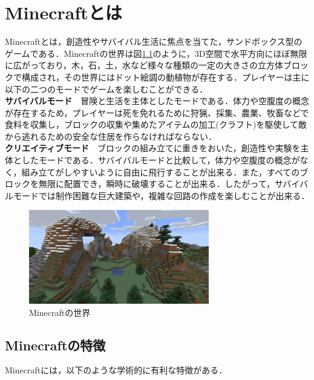 \chapter{Minecraftとは}\label{chap:minecraft}	%
\thispagestyle{plain}   %

Minecraftとは，創造性やサバイバル生活に焦点を当てた，サンドボックス型のゲームである．Minecraftの世界は図\ref{fig:mc_world}のように，3D空間で水平方向にほぼ無限に広がっており，木，石，土，水など様々な種類の一定の大きさの立方体ブロックで構成され，その世界にはドット絵調の動植物が存在する．プレイヤーは主に以下の二つのモードでゲームを楽しむことができる．\\

\textbf{サバイバルモード}　冒険と生活を主体としたモードである．体力や空腹度の概念が存在するため，プレイヤーは死を免れるために狩猟、採集、農業、牧畜などで食料を収集し，ブロックの収集や集めたアイテムの加工(クラフト)を駆使して敵から逃れるための安全な住居を作らなければならない．\\

\textbf{クリエイティブモード}　ブロックの組み立てに重きをおいた，創造性や実験を主体としたモードである．サバイバルモードと比較して，体力や空腹度の概念がなく，組み立てがしやすいように自由に飛行することが出来る．また，すべてのブロックを無限に配置でき，瞬時に破壊することが出来る．したがって，サバイバルモードでは制作困難な巨大建築や，複雑な回路の作成を楽しむことが出来る．\\
\begin{figure}[H]
    \centering
    \includegraphics[width=0.7\textwidth]{fig/minecraft_world.png}
    \caption{Minecraftの世界}
    \label{fig:mc_world}
\end{figure}

\section{Minecraftの特徴}
Minecraftには，以下のような学術的に有利な特徴がある．\\

